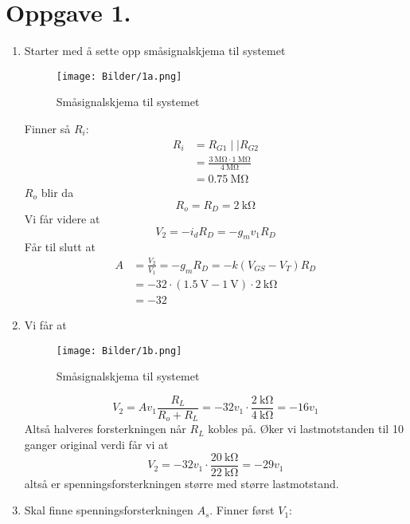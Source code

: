 \documentclass[a4paper,11pt,norsk]{article}
\begin{document}


\section*{Oppgave 1.}
\begin{enumerate}
    \item Starter med å sette opp småsignalskjema til systemet 
        \begin{figure}[H]
            \centering
            \texttt{[image: Bilder/1a.png]}
            \caption{Småsignalskjema til systemet} 
        \end{figure}
        Finner så $R_i$:
        \begin{align*}
            R_i &= R_{G1} \mid\mid R_{G2} \\
                &= \frac{\SI{3}{\mega\ohm} \cdot \SI{1}{\mega\ohm}}{\SI{4}{\mega\ohm}} \\ 
                &= \SI{0.75}{\mega\ohm}
        \end{align*}
        $R_o$ blir da 
        \[
            R_o = R_D = \SI{2}{\kilo\ohm}
        \]
        Vi får videre at 
        \[
            V_2 = -i_{d}R_D = -g_m v_1 R_D
        \]
        Får til slutt at 
        \begin{align*}
            A &= \frac{V_2}{V_1} = -g_m R_D = -k\left(V_{GS} - V_T\right)R_D \\ 
              &= -32 \cdot \left(\SI{1.5}{\volt} - \SI{1}{\volt}\right) \cdot \SI{2}{\kilo\ohm} \\
              &= -32
        \end{align*}
    \item 
        Vi får at 
        \begin{figure}[H]
            \centering
            \texttt{[image: Bilder/1b.png]}
            \caption{Småsignalskjema til systemet} 
        \end{figure}
        \[
            V_2 = A v_1 \frac{R_L}{R_o + R_L} = -32 v_1 \cdot \frac{\SI{2}{\kilo\ohm}}{\SI{4}{\kilo\ohm}} = -16 v_1
        \]
        Altså halveres forsterkningen når $R_L$ kobles på.
        Øker vi lastmotstanden til 10 ganger original verdi får vi at
        \[
            V_2 = -32 v_1 \cdot \frac{\SI{20}{\kilo\ohm}}{\SI{22}{\kilo\ohm}} = -29 v_1
        \]
        altså er spenningsforsterkningen større med større lastmotstand.
    \item Skal finne spenningsforsterkningen $A_s$. Finner først $V_1$:
        \[
\]
\end{enumerate}
\end{document}

